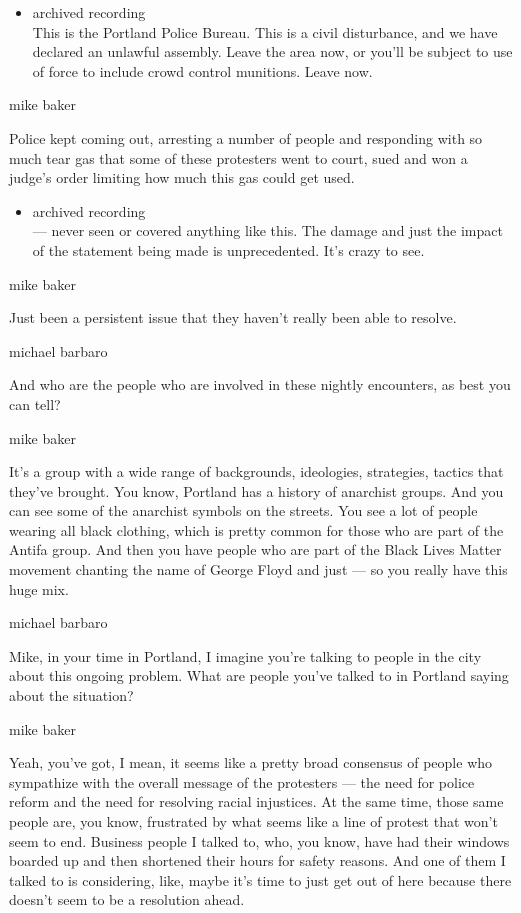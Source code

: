 \begin{itemize}
\tightlist
\item
  archived recording\\
  This is the Portland Police Bureau. This is a civil disturbance, and
  we have declared an unlawful assembly. Leave the area now, or you'll
  be subject to use of force to include crowd control munitions. Leave
  now.
\end{itemize}

mike baker

Police kept coming out, arresting a number of people and responding with
so much tear gas that some of these protesters went to court, sued and
won a judge's order limiting how much this gas could get used.

\begin{itemize}
\tightlist
\item
  archived recording\\
  --- never seen or covered anything like this. The damage and just the
  impact of the statement being made is unprecedented. It's crazy to
  see.
\end{itemize}

mike baker

Just been a persistent issue that they haven't really been able to
resolve.

michael barbaro

And who are the people who are involved in these nightly encounters, as
best you can tell?

mike baker

It's a group with a wide range of backgrounds, ideologies, strategies,
tactics that they've brought. You know, Portland has a history of
anarchist groups. And you can see some of the anarchist symbols on the
streets. You see a lot of people wearing all black clothing, which is
pretty common for those who are part of the Antifa group. And then you
have people who are part of the Black Lives Matter movement chanting the
name of George Floyd and just --- so you really have this huge mix.

michael barbaro

Mike, in your time in Portland, I imagine you're talking to people in
the city about this ongoing problem. What are people you've talked to in
Portland saying about the situation?

mike baker

Yeah, you've got, I mean, it seems like a pretty broad consensus of
people who sympathize with the overall message of the protesters --- the
need for police reform and the need for resolving racial injustices. At
the same time, those same people are, you know, frustrated by what seems
like a line of protest that won't seem to end. Business people I talked
to, who, you know, have had their windows boarded up and then shortened
their hours for safety reasons. And one of them I talked to is
considering, like, maybe it's time to just get out of here because there
doesn't seem to be a resolution ahead.

